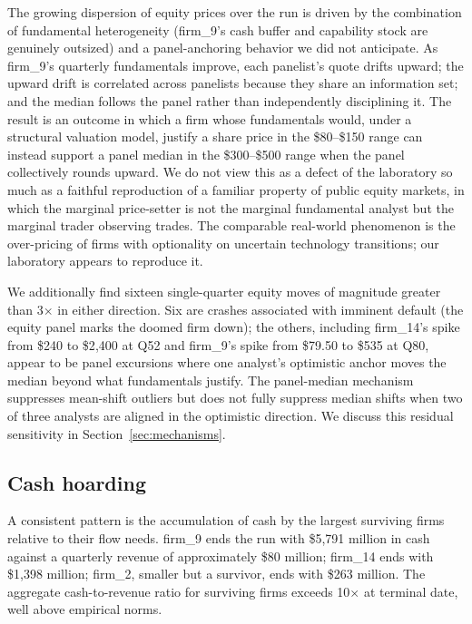 \documentclass[11pt]{article}
\begin{document}
The growing dispersion of equity prices over the run is driven by the
combination of fundamental heterogeneity (firm\_9's cash buffer and
capability stock are genuinely outsized) and a panel-anchoring
behavior we did not anticipate. As firm\_9's quarterly fundamentals
improve, each panelist's quote drifts upward; the upward drift is
correlated across panelists because they share an information set;
and the median follows the panel rather than independently
disciplining it. The result is an outcome in which a firm whose
fundamentals would, under a structural valuation model, justify a
share price in the \$80--\$150 range can instead support a panel
median in the \$300--\$500 range when the panel collectively rounds
upward. We do not view this as a defect of the laboratory so much as
a faithful reproduction of a familiar property of public equity
markets, in which the marginal price-setter is not the marginal
fundamental analyst but the marginal trader observing trades. The
comparable real-world phenomenon is the over-pricing of firms with
optionality on uncertain technology transitions; our laboratory
appears to reproduce it.

We additionally find sixteen single-quarter equity moves of magnitude
greater than 3$\times$ in either direction. Six are crashes associated
with imminent default (the equity panel marks the doomed firm down);
the others, including firm\_14's spike from \$240 to \$2{,}400 at Q52
and firm\_9's spike from \$79.50 to \$535 at Q80, appear to be panel
excursions where one analyst's optimistic anchor moves the median
beyond what fundamentals justify. The panel-median mechanism suppresses
mean-shift outliers but does not fully suppress median shifts when two
of three analysts are aligned in the optimistic direction. We discuss
this residual sensitivity in Section~\ref{sec:mechanisms}.

\subsection{Cash hoarding}

A consistent pattern is the accumulation of cash by the largest surviving
firms relative to their flow needs. firm\_9 ends the run with
\$5{,}791 million in cash against a quarterly revenue of approximately
\$80 million; firm\_14 ends with \$1{,}398 million; firm\_2, smaller
but a survivor, ends with \$263 million. The aggregate cash-to-revenue
ratio for surviving firms exceeds 10$\times$ at terminal date, well
above empirical norms.
\end{document}

